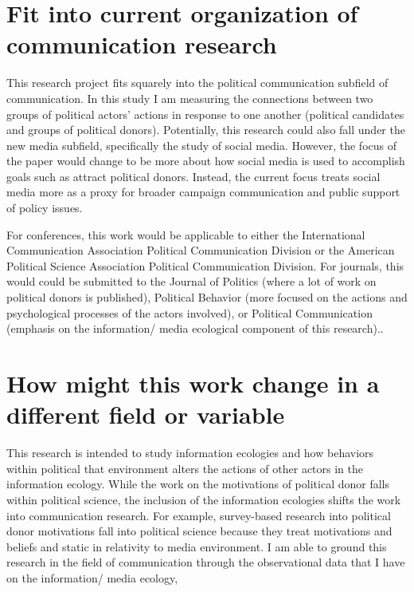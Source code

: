 \documentclass[12pt,]{article}
\begin{document}
\hypertarget{fit-into-current-organization-of-communication-research}{%
\section{Fit into current organization of communication
research}\label{fit-into-current-organization-of-communication-research}}

This research project fits squarely into the political communication
subfield of communication. In this study I am measuring the connections
between two groups of political actors' actions in response to one
another (political candidates and groups of political donors).
Potentially, this research could also fall under the new media subfield,
specifically the study of social media. However, the focus of the paper
would change to be more about how social media is used to accomplish
goals such as attract political donors. Instead, the current focus
treats social media more as a proxy for broader campaign communication
and public support of policy issues.

For conferences, this work would be applicable to either the
International Communication Association Political Communication Division
or the American Political Science Association Political Communication
Division. For journals, this would could be submitted to the Journal of
Politics (where a lot of work on political donors is published),
Political Behavior (more focused on the actions and psychological
processes of the actors involved), or Political Communication (emphasis
on the information/ media ecological component of this research)..

\hypertarget{how-might-this-work-change-in-a-different-field-or-variable}{%
\section{How might this work change in a different field or
variable}\label{how-might-this-work-change-in-a-different-field-or-variable}}

This research is intended to study information ecologies and how
behaviors within political that environment alters the actions of other
actors in the information ecology. While the work on the motivations of
political donor falls within political science, the inclusion of the
information ecologies shifts the work into communication research. For
example, survey-based research into political donor motivations fall
into political science because they treat motivations and beliefs and
static in relativity to media environment. I am able to ground this
research in the field of communication through the observational data
that I have on the information/ media ecology,





\newpage
\singlespacing 
\end{document}
